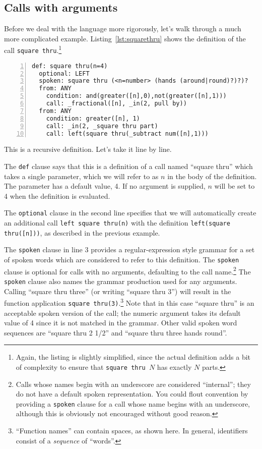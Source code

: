 \documentclass[12pt]{article}
\newcommand{\clause}[1]{\texttt{#1}}
\renewcommand{\call}[1]{\texttt{#1}} %
\begin{document}
\subsection{Calls with arguments}

Before we deal with the language more rigorously, let's walk through
a much more complicated example.  Listing~\ref{lst:squarethru} shows
the definition of the call \call{square thru}.\footnote{Again, the listing is
  slightly simplified, since the actual definition adds a bit of
  complexity to ensure that \call{square thru $N$} has exactly
  $N$ parts.}

\begin{lstlisting}[numbers=left,float,caption=A definition with arguments.,label=lst:squarethru]
def: square thru(n=4)
  optional: LEFT
  spoken: square thru (<n=number> (hands (around|round)?)?)?
  from: ANY
    condition: and(greater([n],0),not(greater([n],1)))
    call: _fractional([n], _in(2, pull by))
  from: ANY
    condition: greater([n], 1)
    call: _in(2, _square thru part)
    call: left(square thru(_subtract num([n],1)))
\end{lstlisting}

This is a recursive definition.  Let's take it line by line.

The \clause{def} clause says that this is a definition of a call named
``square thru'' which takes a single parameter, which we will refer to
as $n$ in the body of the definition.  The parameter has a
default value, 4.  If no argument is supplied, $n$ will be set
to 4 when the definition is evaluated.

The \clause{optional} clause in the second line specifies that we will
automatically create an
additional call \call{left square thru(n)} with the definition
\call{left(square thru([n]))}, as described in the previous example.

The \clause{spoken} clause in line 3 provides a regular-expression style grammar
for a set of spoken words which are considered to refer to this
definition.  The \clause{spoken} clause is optional for calls with no
arguments, defaulting to the call name.\footnote{Calls whose names
  begin with an underscore are considered ``internal''; they do not
  have a default spoken representation.  You could flout
  convention by providing a \clause{spoken} clause for a call whose
  name begins with an underscore, although this is obviously not
  encouraged without good reason.}
The \clause{spoken} clause also names the grammar production used for
any arguments.  Calling ``square thru three'' (or writing ``square
thru 3'') will result in the function application \texttt{square
  thru(3)}.\footnote{``Function names'' can contain spaces, as shown
  here.  In general, identifiers consist of a \textit{sequence} of ``words''.}
Note that in this case ``square thru'' is an
acceptable spoken version of the call; the numeric argument takes its
default value of 4 since it is not matched in the grammar.  Other
valid spoken word sequences are ``square thru 2 1/2'' and ``square
thru three hands round''.
\end{document}
